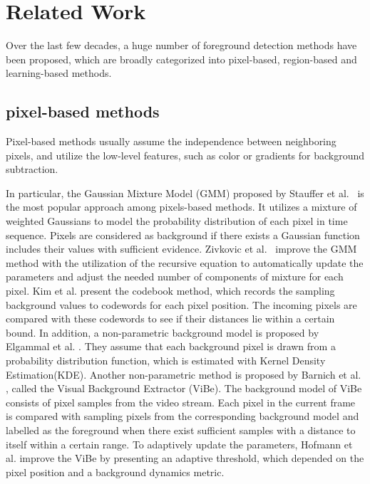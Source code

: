 \documentclass[journal]{IEEEtran}
\begin{document}
\section{Related Work}
\label{sec2}
Over the last few decades, a huge number of foreground detection methods have been proposed,
which are broadly categorized into pixel-based, region-based and learning-based methods.
\subsection{pixel-based methods}
Pixel-based methods usually assume the independence between neighboring pixels,
and utilize the low-level features, such as color or gradients for background subtraction.

In particular, the Gaussian Mixture Model (GMM) proposed by Stauffer et al.\ \cite{Stauffer1999} is the most popular approach among pixels-based methods\cite{Goyal2018}.
It utilizes a mixture of weighted Gaussians to model the probability distribution of each pixel in time sequence.
Pixels are considered as background if there exists a Gaussian function includes their values with sufficient evidence. 
Zivkovic et al.\ \cite{Zivkovic2004} improve the GMM method with the utilization of the recursive equation
to automatically update the parameters and adjust the needed number of components of mixture for each pixel. 
%
Kim et al.\cite{Kim2005} present the codebook method, which records the sampling background values to codewords for each pixel position.
The incoming pixels are compared with these codewords to see if their distances lie within a certain bound. 
In addition, a non-parametric background model is proposed by Elgammal et al. \cite{Elgammal2000Non}. 
They assume that each background pixel is drawn from a probability distribution function, which is estimated with Kernel Density Estimation(KDE). 
Another non-parametric method is proposed by Barnich et al. \cite{Barnich2011_2011_TIP}, called the Visual Background Extractor (ViBe). The background model of ViBe consists of pixel samples from the video stream. Each pixel in the current frame is compared with sampling pixels from the corresponding background model and labelled as the foreground when there exist sufficient samples with a distance to itself within a certain range. 
To adaptively update the parameters, Hofmann et al.\cite{Hofmann2012Background} improve the ViBe by presenting an adaptive threshold, which depended on the pixel position and a background dynamics metric.
\end{document}
